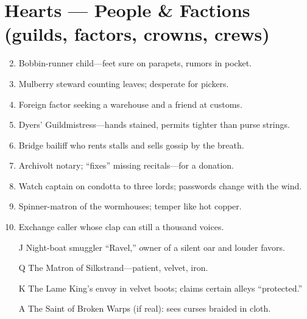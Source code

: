 \section*{Hearts --- People \& Factions (guilds, factors, crowns, crews)}
\label{sec:silkstrand-people}
\begin{enumerate}
\setcounter{enumi}{1}
\item Bobbin-runner child---feet sure on parapets, rumors in pocket.
\item Mulberry steward counting leaves; desperate for pickers.
\item Foreign factor seeking a warehouse and a friend at customs.
\item Dyers' Guildmistress---hands stained, permits tighter than purse strings.
\item Bridge bailiff who rents stalls and sells gossip by the breath.
\item Archivolt notary; ``fixes'' missing recitals---for a donation.
\item Watch captain on condotta to three lords; passwords change with the wind.
\item Spinner-matron of the wormhouses; temper like hot copper.
\item Exchange caller whose clap can still a thousand voices.
\item[J] Night-boat smuggler ``Ravel,'' owner of a silent oar and louder favors.
\item[Q] The Matron of Silkstrand---patient, velvet, iron.
\item[K] The Lame King's envoy in velvet boots; claims certain alleys ``protected.''
\item[A] The Saint of Broken Warps (if real): sees curses braided in cloth.
\end{enumerate}

